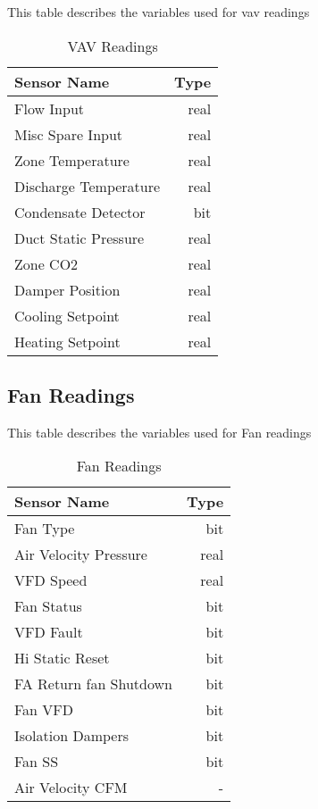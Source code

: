 This table describes the variables used for \gls{vav} readings

\begin{table}[!htb]
\centering
\begin{tabular}{| l r |}
	\hline
	\textbf{Sensor Name}           & \textbf{Type} \\ 
  	\hline
  	Flow Input            & real \\
Misc Spare Input      & real \\
Zone Temperature      & real \\
Discharge Temperature & real \\
Condensate Detector   & bit  \\
Duct Static Pressure  & real \\
Zone CO2              & real \\
Damper Position       & real \\
Cooling Setpoint      & real \\
Heating Setpoint      & real \\
  	\hline
\end{tabular}
\caption{VAV Readings}
\label{table:vav_readings}
\end{table}


\subsection{Fan Readings}

This table describes the variables used for Fan readings

\begin{table}[!htb]
\centering
\begin{tabular}{| l r |}
	\hline
	\textbf{Sensor Name}           & \textbf{Type} \\ 
  	\hline
  	Fan Type               & bit  \\
Air Velocity Pressure  & real \\
VFD Speed              & real \\
Fan Status             & bit  \\
VFD Fault              & bit  \\
Hi Static Reset        & bit  \\
FA Return fan Shutdown & bit  \\
Fan VFD                & bit  \\
Isolation Dampers      & bit  \\
Fan SS                 & bit  \\
Air Velocity CFM       & -   \\
  	\hline
\end{tabular}
\caption{Fan Readings}
\label{table:fan_readings}
\end{table}


